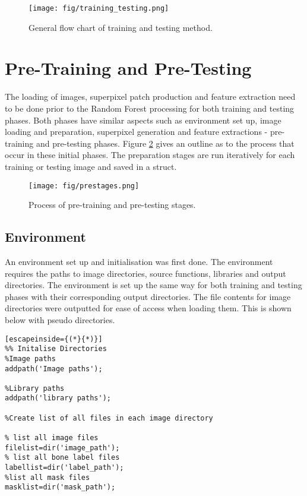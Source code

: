 \begin{figure}[H]
\centering
\texttt{[image: fig/training\_testing.png]}
\caption{General flow chart of training and testing method.}
\label{fig:training_testing_flow}
\end{figure}

\section{Pre-Training and Pre-Testing}
\label{sect:pre}
The loading of images, superpixel patch production and feature extraction need to be done prior to the Random Forest processing for both training and testing phases. Both phases have similar aspects such as environment set up, image loading and preparation, superpixel generation and feature extractions - pre-training and pre-testing phases. Figure \ref{fig:prestages} gives an outline as to the process that occur in these initial phases. The preparation stages are run iteratively for each training or testing image and saved in a struct.

\begin{figure}[H]
\centering
\texttt{[image: fig/prestages.png]}
\caption{Process of pre-training and pre-testing stages.}
\label{fig:prestages}
\end{figure}

\subsection{Environment}
An environment set up and initialisation was first done. The environment requires the paths to image directories, source functions, libraries and output directories. The environment is set up the same way for both training and testing phases with their corresponding output directories. The file contents for image directories were outputted for ease of access when loading them.  This is shown below with pseudo directories.

\begin{lstlisting}[escapeinside={(*}{*)}]
%% Initalise Directories 
%Image paths
addpath('Image paths');

%Library paths
addpath('library paths');

%Create list of all files in each image directory

% list all image files
filelist=dir('image_path'); 
% list all bone label files
labellist=dir('label_path');
%list all mask files 
masklist=dir('mask_path'); 
\end{lstlisting}


